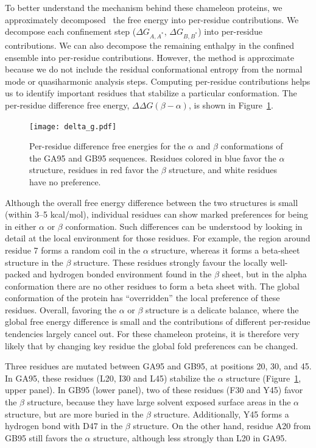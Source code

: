 \documentclass[12pt]{article}
\begin{document}
To better understand the mechanism behind these chameleon proteins, we approximately decomposed~\cite{Tyka2006} the free
energy into per-residue contributions. We decompose each confinement step ($\Delta G_{A,A^\ast}$, $\Delta G_{B,B^\ast}$)
into per-residue contributions. We can also decompose the remaining enthalpy in the confined ensemble into per-residue
contributions. However, the method is approximate because we do not include the residual conformational entropy from the
normal mode or quasiharmonic analysis steps. Computing per-residue contributions helps us to identify important residues
that stabilize a particular conformation. The per-residue difference free energy, $\Delta \Delta G (\beta - \alpha)$, is
shown in Figure~\ref{fig:perresidue_orban}.

\begin{figure}
    \begin{center}
        \texttt{[image: delta\_g.pdf]}
    \end{center}
    \caption{Per-residue difference free energies for the $\alpha$ and $\beta$ conformations of the GA95 and GB95
        sequences. Residues colored in blue favor the $\alpha$ structure, residues in red favor the $\beta$ structure,
        and white residues have no preference.}
\label{fig:perresidue_orban}
\end{figure}

Although the overall free energy difference between the two structures is small (within 3--5 kcal/mol), individual
residues can show marked preferences for being in either $\alpha$ or $\beta$ conformation. Such differences can be
understood by looking in detail at the local environment for those residues. For example, the region around residue 7
forms a random coil in the $\alpha$ structure, whereas it forms a beta-sheet structure in the $\beta$ structure. These
residues strongly favour the locally well-packed and hydrogen bonded environment found in the $\beta$ sheet, but in the
alpha conformation there are no other residues to form a beta sheet with. The global conformation of the protein has
``overridden'' the local preference of these residues. Overall, favoring the $\alpha$ or $\beta$ structure is a delicate
balance, where the global free energy difference is small and the contributions of different per-residue tendencies
largely cancel out. For these chameleon proteins, it is therefore very likely that by changing key residue the global
fold preferences can be changed.

Three residues are mutated between GA95 and GB95, at positions 20, 30, and 45. In GA95, these residues (L20, I30 and
L45) stabilize the $\alpha$ structure (Figure~\ref{fig:perresidue_orban}, upper panel). In GB95 (lower panel), two of
these residues (F30 and Y45) favor the $\beta$ structure, because they have large solvent exposed surface areas in the
$\alpha$ structure, but are more buried in the $\beta$ structure. Additionally, Y45 forms a hydrogen bond with D47 in
the $\beta$ structure. On the other hand, residue A20 from GB95 still favors the $\alpha$ structure, although less
strongly than L20 in GA95.
\end{document}
